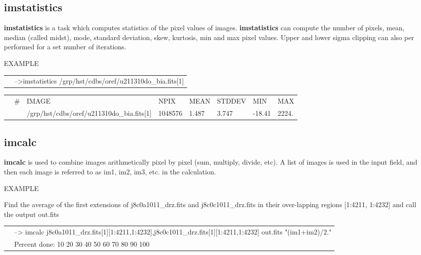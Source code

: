 \subsection{{\bf imstatistics}}
{\bf imstatistics} is a task which computes statistics of the pixel values of images. {\bf imstatistics} can compute the number of pixels, mean, median (called midst), mode, standard deviation, skew, kurtosis, min and max pixel values. Upper and lower sigma clipping can also per performed for a set number of iterations. 

EXAMPLE


\begin{minipage}{5.0in}
\setlength{\oddsidemargin}{0.25 in}
\setlength{\evensidemargin}{0.25 in}
\begin{tabular}{ll}
&{\color{RoyalBlue}-->imstatistics /grp/hst/cdbs/oref/u211310do\_bia.fits[1]} \\
\end{tabular}
\begin{tabular}{llllllll}
&{\color{Green} \# }&               {\color{Green}IMAGE}&      {\color{Green}NPIX} &     {\color{Green}MEAN}&    {\color{Green}STDDEV}  &     {\color{Green}MIN}    &   {\color{Green}MAX} \\
& & {\color{Green}/grp/hst/cdbs/oref/u211310do\_bia.fits[1]}   &{\color{Green}1048576}    & {\color{Green}1.487}   & {\color{Green} 3.747 }&  {\color{Green} -18.41 }  &  {\color{Green}2224.} \\
\end{tabular}
\end{minipage}

\subsection{{\bf imcalc}}
{\bf imcalc} is used to combine images arithmetically pixel by pixel (sum, multiply, divide, etc). A list of images is used in the input field, and then each image is referred to as im1, im2, im3, etc. in the calculation.

EXAMPLE

\begin{minipage}{5.0in}
\setlength{\oddsidemargin}{0.25 in}
\setlength{\evensidemargin}{0.25 in}
Find the average of the first extensions of j8c0a1011\_drz.fits and j8c0c1011\_drz.fits in their over-lapping regions [1:4211, 1:4232] and call the output out.fits\\
\begin{tabular}{ll}
&{\color{RoyalBlue} \footnotesize{--> imcalc j8c0a1011\_drz.fits[1][1:4211,1:4232],j8c0c1011\_drz.fits[1][1:4211,1:4232]  out.fits "(im1+im2)/2."}} \\
&{\color{Green}Percent done: 10 20 30 40 50 60 70 80 90 100}\\
\end{tabular}
\end{minipage}



